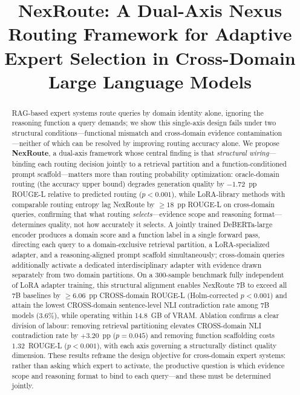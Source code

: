 \documentclass[a4paper,fleql,doubleblind]{cas-sc}
\begin{document}
\let\WriteBookmarks\relax
\def\floatpagepagefraction{0.7}
\def\textpagefraction{0.3}

\shortauthors{}

\title[mode=title]{NexRoute: A Dual-Axis Nexus Routing Framework for Adaptive
Expert Selection in Cross-Domain Large Language Models}

\author[1]{}



\begin{abstract}
RAG-based expert systems route queries by domain identity alone, ignoring the reasoning function a query demands; we show this single-axis design fails under two structural conditions---functional mismatch and cross-domain evidence contamination---neither of which can be resolved by improving routing accuracy alone.
We propose \textbf{NexRoute}, a dual-axis framework whose central finding is that \emph{structural wiring}---binding each routing decision jointly to a retrieval partition and a function-conditioned prompt scaffold---matters more than routing probability optimization: oracle-domain routing (the accuracy upper bound) degrades generation quality by $-1.72$~pp ROUGE-L relative to predicted routing ($p{<}0.001$), while LoRA-library methods with comparable routing entropy lag NexRoute by ${\geq}18$~pp ROUGE-L on cross-domain queries, confirming that what routing \emph{selects}---evidence scope and reasoning format---determines quality, not how accurately it selects.
A jointly trained DeBERTa-large encoder produces a domain score and a function label in a single forward pass, directing each query to a domain-exclusive retrieval partition, a LoRA-specialized adapter, and a reasoning-aligned prompt scaffold simultaneously; cross-domain queries additionally activate a dedicated interdisciplinary adapter with evidence drawn separately from two domain partitions.
On a 300-sample benchmark fully independent of LoRA adapter training, this structural alignment enables NexRoute 7B to exceed all 7B baselines by ${\geq}6.06$~pp CROSS-domain ROUGE-L (Holm-corrected $p{<}0.001$) and attain the lowest CROSS-domain sentence-level NLI contradiction rate among 7B models ($3.6\%$), while operating within 14.8~GB of VRAM.
Ablation confirms a clear division of labour: removing retrieval partitioning elevates CROSS-domain NLI contradiction rate by $+3.20$~pp ($p{=}0.045$) and removing function scaffolding costs $1.32$~ROUGE-L ($p{<}0.001$), with each axis governing a structurally distinct quality dimension.
These results reframe the design objective for cross-domain expert systems: rather than asking which expert to activate, the productive question is which evidence scope and reasoning format to bind to each query---and these must be determined jointly.
\end{abstract}
\end{document}
